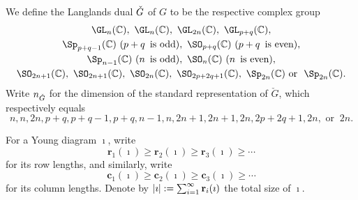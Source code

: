 \documentclass[counting_main.tex]{subfiles}
\begin{document}
 We define the Langlands dual $\check{G}$ of $G$ to be the respective complex group
 \[
   \begin{array}{c}
     \GL_n(\C), \ \GL_n(\C), \  \GL_{2n}(\C),\  \GL_{p+q}(\C),\smallskip\\
     \Sp_{p+q-1}(\C)\ (p+q\, \textrm{ is odd}),  \  \SO_{p+q}(\C)\  (p+q\, \textrm{ is even}),\smallskip\\
     \Sp_{n-1}(\C) \ (n\, \textrm{ is odd}),  \
     \SO_n(\C) \ (n\, \textrm{ is even}),\smallskip \\
     \SO_{2n+1}(\C), \ \SO_{2n+1}(\C), \  \SO_{2n}(\C), \  \SO_{2p+2q+1}(\C),\    \Sp_{2n}(\C) \  \textrm{or } \  \Sp_{2n}(\C).
   \end{array}
 \]
 Write $n_{\check{G}}$ for the dimension of the standard representation of $\check G$,
 which respectively equals
 \[
   n, n, 2n, p+q, p+q-1, p+q, n-1, n, 2n+1, 2n+1, 2n, 2p+2q+1, 2n, \textrm{ or
   }\ 2n.
 \]

 For a Young diagram $\imath$, write
 \[
   \mathbf r_1(\imath)\geq \mathbf r_2(\imath)\geq \mathbf r_3(\imath)\geq \cdots
 \]
 for its row lengths, and similarly, write
 \[
   \mathbf c_1(\imath)\geq \mathbf c_2(\imath)\geq \mathbf c_3(\imath)\geq \cdots
 \]
 for its column lengths. Denote by
 $\left|{\imath}\right|:=\sum_{i=1}^\infty \mathbf r_i(\imath)$ the total size of
 $\imath$.

\end{document}
